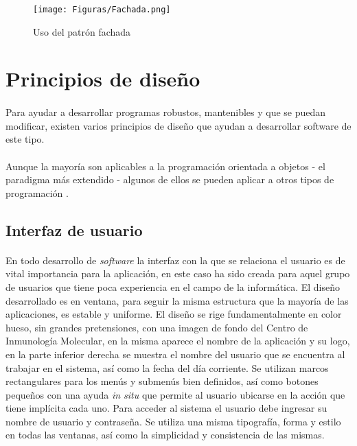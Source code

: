 \begin{figure}%
	\centering
	\texttt{[image: Figuras/Fachada.png]}
	\caption{Uso del patrón fachada}
	\label{fig:Fachada}
\end{figure}

\section{Principios de diseño}
\paragraph{}Para ayudar a desarrollar programas robustos, mantenibles y que se puedan modificar, existen varios principios de diseño que ayudan a desarrollar software de este tipo.
\paragraph{}Aunque la mayoría son aplicables a la programación orientada a objetos - el paradigma más extendido - algunos de ellos se pueden aplicar a otros tipos de programación \cite{rubenfa_doce_2014}.

\subsection{Interfaz de usuario}
\paragraph{}En todo desarrollo de \textit{software} la interfaz con la que se relaciona el usuario es de vital importancia para la aplicación, en este caso ha sido creada para aquel grupo de usuarios que tiene poca experiencia en el campo de la informática. El diseño desarrollado es en ventana, para seguir la misma estructura que la mayoría de las aplicaciones, es estable y uniforme. El diseño se rige fundamentalmente en color hueso, sin grandes pretensiones, con una imagen de fondo del Centro de Inmunología Molecular, en la misma aparece el nombre de la aplicación y su logo, en la parte inferior derecha se muestra el nombre del usuario que se encuentra al trabajar en el sistema, así como la fecha del día corriente. Se utilizan marcos rectangulares para los menús y submenús bien definidos, así como botones pequeños con una ayuda \textit{in situ} que permite al usuario ubicarse en la acción que tiene implícita cada uno. Para acceder al sistema el usuario debe ingresar su nombre de usuario y contraseña. Se utiliza una misma tipografía, forma y estilo en todas las ventanas, así como la simplicidad y consistencia de las mismas. 
